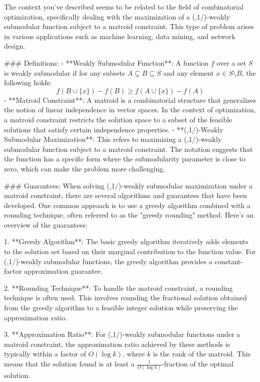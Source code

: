 The context you've described seems to be related to the field of combinatorial optimization, specifically dealing with the maximization of a (,1/)-weakly submodular function subject to a matroid constraint. This type of problem arises in various applications such as machine learning, data mining, and network design.

### Definitions:
- **Weakly Submodular Function**: A function \( f \) over a set \( S \) is weakly submodular if for any subsets \( A \subseteq B \subseteq S \) and any element \( x \in S \setminus B \), the following holds:
  \[
  f(B \cup \{x\}) - f(B) \geq f(A \cup \{x\}) - f(A)
  \]
- **Matroid Constraint**: A matroid is a combinatorial structure that generalizes the notion of linear independence in vector spaces. In the context of optimization, a matroid constraint restricts the solution space to a subset of the feasible solutions that satisfy certain independence properties.
- **(,1/)-Weakly Submodular Maximization**: This refers to maximizing a (,1/)-weakly submodular function subject to a matroid constraint. The notation suggests that the function has a specific form where the submodularity parameter is close to zero, which can make the problem more challenging.

### Guarantees:
When solving (,1/)-weakly submodular maximization under a matroid constraint, there are several algorithms and guarantees that have been developed. One common approach is to use a greedy algorithm combined with a rounding technique, often referred to as the "greedy rounding" method. Here's an overview of the guarantees:

1. **Greedy Algorithm**: The basic greedy algorithm iteratively adds elements to the solution set based on their marginal contribution to the function value. For (,1/)-weakly submodular functions, the greedy algorithm provides a constant-factor approximation guarantee.

2. **Rounding Technique**: To handle the matroid constraint, a rounding technique is often used. This involves rounding the fractional solution obtained from the greedy algorithm to a feasible integer solution while preserving the approximation ratio.

3. **Approximation Ratio**: For (,1/)-weakly submodular functions under a matroid constraint, the approximation ratio achieved by these methods is typically within a factor of \( O(\log k) \), where \( k \) is the rank of the matroid. This means that the solution found is at least a \( \frac{1}{O(\log k)} \)-fraction of the optimal solution.

